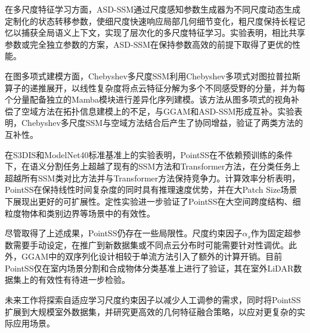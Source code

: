 \documentclass[12pt,a4paper,openany,oneside]{ctexbook}
\theoremstyle{definition}
\theoremstyle{remark}
\begin{document}
在多尺度特征学习方面，ASD-SSM通过尺度感知参数生成器为不同尺度动态生成定制化的状态转移参数，使细尺度快速响应局部几何细节变化，粗尺度保持长程记忆以捕获全局语义上下文，实现了层次化的多尺度特征学习。实验表明，相比共享参数或完全独立参数的方案，ASD-SSM在保持参数高效的前提下取得了更优的性能。

在图多项式建模方面，Chebyshev多尺度SSM利用Chebyshev多项式对图拉普拉斯算子的递推展开，以线性复杂度将点云特征分解为多个不同感受野的分量，并为每个分量配备独立的Mamba模块进行差异化序列建模。该方法从图多项式的视角补偿了空域方法在拓扑信息建模上的不足，与GGAM和ASD-SSM形成互补。实验表明，Chebyshev多尺度SSM与空域方法结合后产生了协同增益，验证了两类方法的互补性。

在S3DIS和ModelNet40标准基准上的实验表明，PointSS在不依赖预训练的条件下，在语义分割任务上超越了现有的SSM方法和Transformer方法，在分类任务上超越所有SSM类对比方法并与Transformer方法保持竞争力。计算效率分析表明，PointSS在保持线性时间复杂度的同时具有推理速度优势，并在大Patch Size场景下展现出更好的可扩展性。定性实验进一步验证了PointSS在大空间跨度结构、细粒度物体和类别边界等场景中的有效性。

尽管取得了上述成果，PointSS仍存在一些局限性。尺度约束因子$\alpha_s$作为固定超参数需要手动设定，在推广到新数据集或不同点云分布时可能需要针对性调优。此外，GGAM中的双序列化设计相较于单流方法引入了额外的计算开销。目前PointSS仅在室内场景分割和合成物体分类基准上进行了验证，其在室外LiDAR数据集上的有效性有待进一步检验。

未来工作将探索自适应学习尺度约束因子以减少人工调参的需求，同时将PointSS扩展到大规模室外数据集，并研究更高效的几何特征融合策略，以应对更复杂的实际应用场景。









\end{document}
